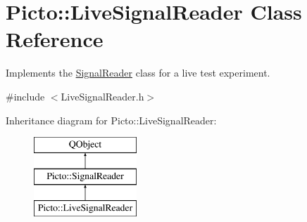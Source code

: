 \hypertarget{class_picto_1_1_live_signal_reader}{\section{Picto\-:\-:Live\-Signal\-Reader Class Reference}
\label{class_picto_1_1_live_signal_reader}
}


Implements the \hyperlink{class_picto_1_1_signal_reader}{Signal\-Reader} class for a live test experiment.  




{\ttfamily \#include $<$Live\-Signal\-Reader.\-h$>$}

Inheritance diagram for Picto\-:\-:Live\-Signal\-Reader\-:\begin{figure}[H]
\begin{center}
\leavevmode
\includegraphics[height=3.000000cm]{class_picto_1_1_live_signal_reader}
\end{center}
\end{figure}
